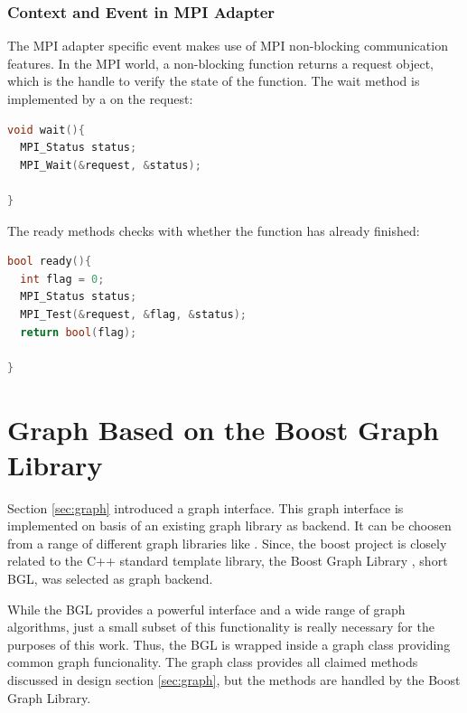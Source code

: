 \subsubsection{Context and Event in MPI Adapter}
The MPI adapter specific event makes use of MPI non-blocking
communication features. In the MPI world, a non-blocking function
returns a request object, which is the handle to verify the state of
the function. The wait method is implemented by a  on
the request:

\begin{lstlisting}[language=C++, label=lst:mpi_event_wait]
void wait(){
  MPI_Status status;
  MPI_Wait(&request, &status);

}
\end{lstlisting}

The ready methods checks with  whether the function has
already finished:

\begin{lstlisting}[language=C++, label=lst:mpi_event_ready]
bool ready(){
  int flag = 0;
  MPI_Status status;
  MPI_Test(&request, &flag, &status);
  return bool(flag);

}
\end{lstlisting}



\section{Graph Based on the Boost Graph Library}

Section \ref{sec:graph} introduced a graph interface.  This graph
interface is implemented on basis of an existing graph library as
backend. It can be choosen from a range of different graph libraries
like \cite{ref:lemon, ref:boost_bgl, ref:igraph, ref:ogdf}.
Since, the boost project is closely related to the C++ standard
template library, the Boost Graph Library \cite{ref:boost_bgl}, short
BGL, was selected as graph backend.

While the BGL provides a powerful interface and a wide range of graph
algorithms, just a small subset of this functionality is really
necessary for the purposes of this work. Thus, the BGL is wrapped
inside a graph class providing common graph funcionality.  The
graph class provides all claimed methods discussed in design section
\ref{sec:graph}, but the methods are handled by the Boost Graph Library.



